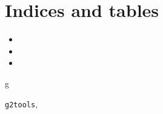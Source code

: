 \documentclass[letterpaper,10pt,english]{sphinxmanual}
\begin{document}
\chapter{Indices and tables}
\label{index:indices-and-tables}\begin{itemize}
\item {} 

\item {} 

\item {} 

\end{itemize}


\renewcommand{\indexname}{Python Module Index}
\begin{theindex}
\def\bigletter#1{{\Large\sffamily#1}\nopagebreak\vspace{1mm}}
\bigletter{g}
\item {\texttt{g2tools}}, \pageref{g2tools:module-g2tools}
\end{theindex}

\renewcommand{\indexname}{Index}
\printindex
\end{document}
